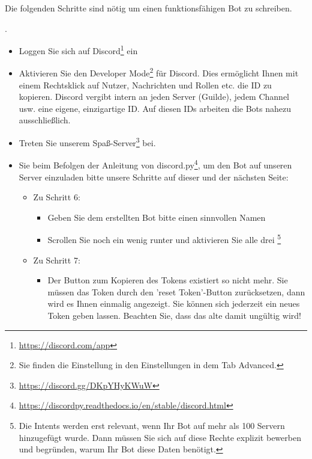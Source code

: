 \documentclass{config/minimal_uebungszettel}
\theoremstyle{definition}
\newcommand{\pp}[1]{\lpl{#1}}
\newcommand{\furl}[1]{\footnote{\url{#1}}}
\begin{document}
	\begin{aufg}[Vorbereitung]\quad
		
		\noindent Die folgenden Schritte sind nötig um einen funktionsfähigen Bot zu schreiben.
		
		\medskip
		
		\noindent{}.
		\begin{itemize}
			\item Loggen Sie sich auf Discord\furl{https://discord.com/app} ein
			
			\item Aktivieren Sie den Developer Mode\footnote{Sie finden die Einstellung in den Einstellungen in dem Tab  \glqq Advanced\grqq.} für Discord.
			Dies ermöglicht Ihnen mit einem Rechtsklick auf Nutzer, Nachrichten und Rollen etc. die ID zu kopieren.
			Discord vergibt intern an jeden Server (Guilde), jedem Channel usw. eine eigene, einzigartige ID. Auf diesen IDs arbeiten die Bots nahezu ausschließlich.
			
			\item Treten Sie unserem Spaß-Server\furl{https://discord.gg/DKpYHyKWuW} bei.
		\end{itemize}
		
		\pagebreak
		
		\noindent{}
		\begin{itemize}
			\item {} Sie beim Befolgen der Anleitung von discord.py\furl{https://discordpy.readthedocs.io/en/stable/discord.html}, um den Bot auf unseren Server einzuladen bitte unsere  Schritte auf dieser und der nächsten Seite:
			\begin{itemize}
				
				\item Zu Schritt 6:
				\begin{itemize}
					\item Geben Sie dem erstellten Bot bitte einen sinnvollen Namen
					\item Scrollen Sie noch ein wenig runter und aktivieren Sie alle drei \pp{Privileged Gateway Intents}\footnote{Die Intents werden erst relevant, wenn Ihr Bot auf mehr als 100 Servern hinzugefügt wurde. Dann müssen Sie sich auf diese Rechte explizit bewerben und begründen, warum Ihr Bot diese Daten benötigt.}
				\end{itemize}
				\item Zu Schritt 7:
				\begin{itemize}
					\item Der Button zum Kopieren des Tokens existiert so nicht mehr. Sie müssen das Token durch den 'reset Token'-Button zurücksetzen, dann wird es Ihnen einmalig angezeigt. Sie können sich jederzeit ein neues Token geben lassen. Beachten Sie, dass das alte damit ungültig wird!
				\end{itemize}
				

\end{itemize}
\end{itemize}
\end{aufg}
\end{document}
